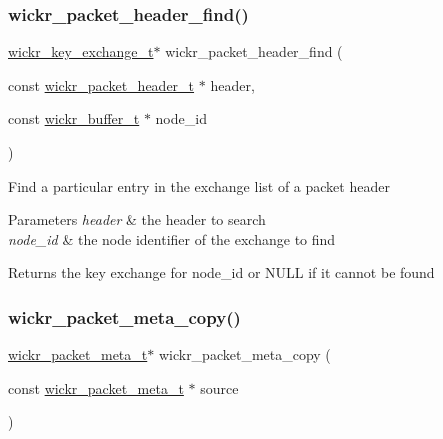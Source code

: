 \subsubsection{\texorpdfstring{wickr\+\_\+packet\+\_\+header\+\_\+find()}{wickr\_packet\_header\_find()}}
{\footnotesize\ttfamily \mbox{\hyperlink{structwickr__key__exchange}{wickr\+\_\+key\+\_\+exchange\+\_\+t}}$\ast$ wickr\+\_\+packet\+\_\+header\+\_\+find (\begin{DoxyParamCaption}\item[{const \mbox{\hyperlink{structwickr__packet__header}{wickr\+\_\+packet\+\_\+header\+\_\+t}} $\ast$}]{header,  }\item[{const \mbox{\hyperlink{structwickr__buffer}{wickr\+\_\+buffer\+\_\+t}} $\ast$}]{node\+\_\+id }\end{DoxyParamCaption})}

Find a particular entry in the exchange list of a packet header


\begin{DoxyParams}{Parameters}
{\em header} & the header to search \\
\hline
{\em node\+\_\+id} & the node identifier of the exchange to find \\
\hline
\end{DoxyParams}
\begin{DoxyReturn}{Returns}
the key exchange for \textquotesingle{}node\+\_\+id\textquotesingle{} or N\+U\+LL if it cannot be found 
\end{DoxyReturn}
\mbox{\label{group__wickr__protocol_ga1bb5a0f2a49069679b174b3e6521fe9b}} 
\subsubsection{\texorpdfstring{wickr\+\_\+packet\+\_\+meta\+\_\+copy()}{wickr\_packet\_meta\_copy()}}
{\footnotesize\ttfamily \mbox{\hyperlink{structwickr__packet__meta}{wickr\+\_\+packet\+\_\+meta\+\_\+t}}$\ast$ wickr\+\_\+packet\+\_\+meta\+\_\+copy (\begin{DoxyParamCaption}\item[{const \mbox{\hyperlink{structwickr__packet__meta}{wickr\+\_\+packet\+\_\+meta\+\_\+t}} $\ast$}]{source }\end{DoxyParamCaption})}

